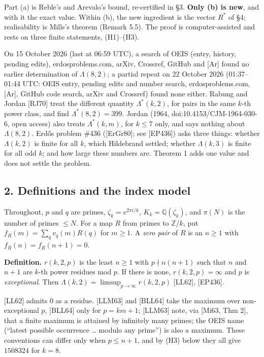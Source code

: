 \documentclass[
]{amsart}
\begin{document}
Part (a) is Reble's and Arevalo's bound, re-certified in §3.
\textbf{Only (b) is new}, and with it the exact value. Within (b), the
new ingredient is the vector \(R^*\) of §4; realisability is Mills's
theorem (Remark 5.5). The proof is computer-assisted and rests on three
finite statements, (H1)--(H3).

On 15 October 2026 (last at 06:59 UTC), a search of OEIS (entry,
history, pending edits), erdosproblems.com, arXiv, Crossref, GitHub and
{[}Ar{]} found no earlier determination of \(\Lambda(8,2)\); a partial
repeat on 22 October 2026 (01:37--01:44 UTC: OEIS entry, pending edits
and number search, erdosproblems.com, {[}Ar{]}, GitHub code search,
arXiv and Crossref) found none either. Rabung and Jordan {[}RJ70{]}
treat the different quantity \(\Lambda^*(k,2)\), for pairs in the same
\(k\)-th power class, and find \(\Lambda^*(8,2)=399\). Jordan (1964,
doi:10.4153/CJM-1964-030-6, open access) also treats \(\Lambda^*(k,m)\),
for \(k\le7\) only, and says nothing about \(\Lambda(8,2)\). Erdős
problem \#436 ({[}ErGr80{]}; see {[}EP436{]}) asks three things: whether
\(\Lambda(k,2)\) is finite for all \(k\), which Hildebrand settled;
whether \(\Lambda(k,3)\) is finite for all odd \(k\); and how large
these numbers are. Theorem 1 adds one value and does not settle the
problem.

\hypertarget{definitions-and-the-index-model}{%
\subsection{2. Definitions and the index
model}\label{definitions-and-the-index-model}}

Throughout, \(p\) and \(q\) are primes, \(\zeta_k=e^{2\pi i/k}\),
\(K_k=\mathbb{Q}(\zeta_k)\), and \(\pi(N)\) is the number of primes
\(\le N\). For a map \(R\) from primes to \(\mathbb{Z}/k\), put
\(f_R(m)=\sum_q v_q(m)R(q)\) for \(m\ge1\). A \emph{zero pair} of \(R\)
is an \(n\ge1\) with \(f_R(n)=f_R(n+1)=0\).

\textbf{Definition.} \(r(k,2,p)\) is the least \(n\ge1\) with
\(p\nmid n(n+1)\) such that \(n\) and \(n+1\) are \(k\)-th power
residues mod \(p\). If there is none, \(r(k,2,p)=\infty\) and \(p\) is
\emph{exceptional}. Then \(\Lambda(k,2)=\limsup_{p\to\infty}r(k,2,p)\)
{[}LL62{]}, {[}EP436{]}.

{[}LL62{]} admits \(0\) as a residue. {[}LLM63{]} and {[}BLL64{]} take
the maximum over non-exceptional \(p\), {[}BLL64{]} only for \(p=km+1\);
{[}LLM63{]} note, via {[}Mi63, Thm 2{]}, that a finite maximum is
attained by infinitely many primes; the OEIS name (``latest possible
occurrence \ldots{} modulo any prime'') is also a maximum. These
conventions can differ only when \(p\le n+1\), and by (H3) below they
all give \(1508324\) for \(k=8\).
\end{document}
